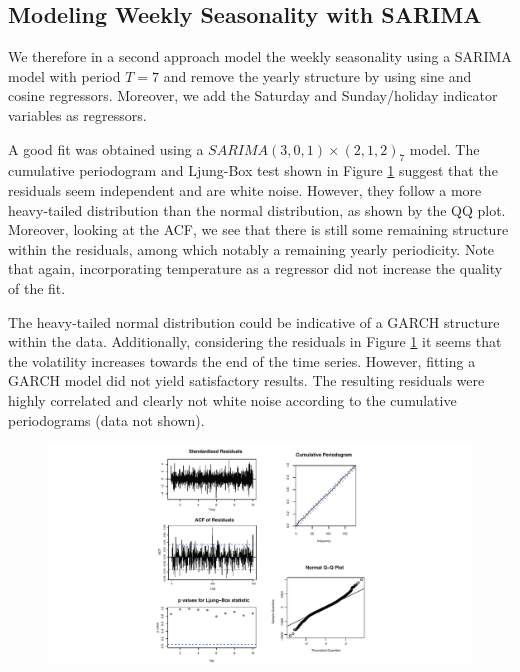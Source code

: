 \documentclass[conference]{IEEEtran}
\begin{document}
\subsection{Modeling Weekly Seasonality with SARIMA}
We therefore in a second approach model the weekly seasonality using a SARIMA model with period $T=7$ and remove the yearly structure by using sine and cosine regressors. Moreover, we add the Saturday and Sunday/holiday indicator variables as regressors. 
\par
A good fit was obtained using a $SARIMA(3, 0, 1)\times(2, 1, 2)_{7}$ model. The cumulative periodogram and Ljung-Box test shown in Figure \ref{daily_sarima} suggest that the residuals seem independent and are white noise. However, they follow a more heavy-tailed distribution than the normal distribution, as shown by the QQ plot. Moreover, looking at the ACF, we see that there is still some remaining structure within the residuals, among which notably a remaining yearly periodicity. Note that again, incorporating temperature as a regressor did not increase the quality of the fit.
\par
The heavy-tailed normal distribution could be indicative of a GARCH structure within the data. Additionally, considering the residuals in Figure \ref{daily_sarima} it seems that the volatility increases towards the end of the time series. However, fitting a GARCH model did not yield satisfactory results. The resulting residuals were highly correlated and clearly not white noise according to the cumulative periodograms (data not shown).

\begin{figure}[ht]
	\centering
	\includegraphics[width=1\textwidth]{Figs/Fig6.pdf}
	\caption{}
	\label{daily_sarima}
\end{figure}
\end{document}
